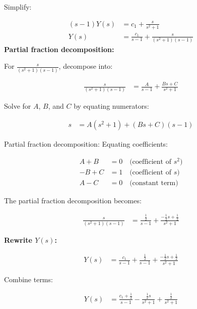 \documentclass{beamer}
\begin{document}
	\begin{frame}
		Simplify:
		
		\begin{align}
			(s - 1)Y(s) &= c_1 + \frac{s}{s^2 + 1} \\
			Y(s) &= \frac{c_1}{s - 1} + \frac{s}{(s^2 + 1)(s - 1)}
		\end{align}
		\textbf{Partial fraction decomposition:}
		
		For $\frac{s}{(s^2 + 1)(s - 1)}$, decompose into:
		
		\begin{align}
			\frac{s}{(s^2 + 1)(s - 1)} &= \frac{A}{s - 1} + \frac{Bs + C}{s^2 + 1}
		\end{align}
		
		Solve for $A$, $B$, and $C$ by equating numerators:
		
		\begin{align}
			s &= A(s^2 + 1) + (Bs + C)(s - 1)
		\end{align}
	\end{frame}
	\begin{frame}{Partial fraction decomposition:}
		Equating coefficients:
		
		\begin{align}
			A + B &= 0 \quad \text{(coefficient of $s^2$)} \\
			-B + C &= 1 \quad \text{(coefficient of $s$)} \\
			A - C &= 0 \quad \text{(constant term)}
		\end{align}
		
		The partial fraction decomposition becomes:
		
		\begin{align}
			\frac{s}{(s^2 + 1)(s - 1)} &= \frac{\frac{1}{2}}{s - 1} + \frac{-\frac{1}{2}s + \frac{1}{2}}{s^2 + 1}
		\end{align}
	\end{frame}
	\begin{frame}
		\textbf{Rewrite $Y(s)$:}
		
		\begin{align}
			Y(s) &= \frac{c_1}{s - 1} + \frac{\frac{1}{2}}{s - 1} + \frac{-\frac{1}{2}s + \frac{1}{2}}{s^2 + 1}
		\end{align}
		
		Combine terms:
		
		\begin{align}
			Y(s) &= \frac{c_1 + \frac{1}{2}}{s - 1} - \frac{\frac{1}{2}s}{s^2 + 1} + \frac{\frac{1}{2}}{s^2 + 1}
		\end{align}
	\end{frame}
\end{document}
